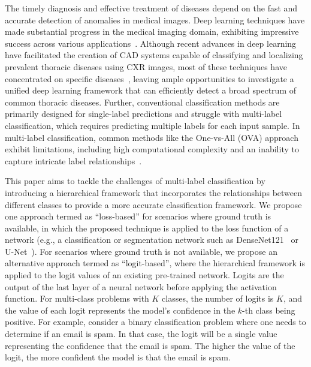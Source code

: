 \documentclass[final,1p,times,authoryear]{elsarticle}
\begin{document}
The timely diagnosis and effective treatment of diseases depend on the fast and accurate detection of anomalies in medical images. Deep learning techniques have made substantial progress in the medical imaging domain, exhibiting impressive success across various applications~\cite{litjens_Survey_2017a,eshghali_Machine_2023}.  Although recent advances in deep learning have facilitated the creation of CAD systems capable of classifying and localizing prevalent thoracic diseases using CXR images, most of these techniques have concentrated on specific diseases~\cite{jaiswal_Identifying_2019,lakhani_Deep_2017,pasa_Efficient_2019,ausawalaithong_Automatic_2018}, leaving ample opportunities to investigate a unified deep learning framework that can efficiently detect a broad spectrum of common thoracic diseases. Further, conventional classification methods are primarily designed for single-label predictions and struggle with multi-label classification, which requires predicting multiple labels for each input sample. In multi-label classification, common methods like the One-vs-All (OVA) approach exhibit limitations, including high computational complexity and an inability to capture intricate label relationships~\cite{tsoumakas_MultiLabel_2007}.

This paper aims to tackle the challenges of multi-label classification by introducing a hierarchical framework that incorporates the relationships between different classes to provide a more accurate classification framework. We propose one approach termed as ``loss-based'' for scenarios where ground truth is available, in which the proposed technique is applied to the loss function of a network (e.g., a classification or segmentation network such as DenseNet121~\cite{huang_Densely_2017} or U-Net~\cite{ronneberger_UNet_2015}). For scenarios where ground truth is not available, we propose an alternative approach termed as ``logit-based'', where the hierarchical framework is applied to the logit values of an existing pre-trained network. Logits are the output of the last layer of a neural network before applying the activation function. For multi-class problems with $K$ classes, the number of logits is $K$, and the value of each logit represents the model's confidence in the $k$-th class being positive. For example, consider a binary classification problem where one needs to determine if an email is spam. In that case, the logit will be a single value representing the confidence that the email is spam. The higher the value of the logit, the more confident the model is that the email is spam.
\end{document}
